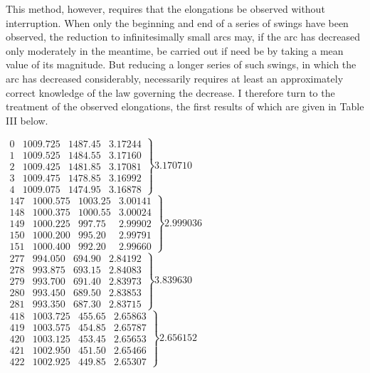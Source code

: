 This method, however, requires that the elongations be observed without interruption. When only the beginning and end of a series of swings have been observed, the reduction to infinitesimally small arcs may, if the arc has decreased only moderately in the meantime, be carried out if need be by taking a mean value of its magnitude. But reducing a longer series of such swings, in which the arc has decreased considerably, necessarily requires at least an approximately correct
knowledge of the law governing the decrease. I therefore turn to the treatment of the observed elongations, the first results of which are given in Table III below.
\begin{center}
\fontsize{9}{11}\selectfont
$\left.\begin{array}{r|r|r|r}
0&1009.725&1487.45&3.17244\\
1&1009.525&1484.55&3.17160\\
2&1009.425&1481.85&3.17081\\
3&1009.475&1478.85&3.16992\\
4&1009.075&1474.95&3.16878
\end{array}\right\}3.170710$\\[6pt]
$\left.\begin{array}{r|r|r|r}
147&1000.575&1003.25&3.00141\\
148&1000.375&1000.55&3.00024\\
149&1000.225&997.75&2.99902\\
150&1000.200&995.20&2.99791\\
151&1000.400&992.20&2.99660
\end{array}\right\}2.999036$\\[6pt]
$\left.\begin{array}{r|r|r|r}
277&994.050&694.90&2.84192\\
278&993.875&693.15&2.84083\\
279&993.700&691.40&2.83973\\
280&993.450&689.50&2.83853\\
281&993.350&687.30&2.83715
\end{array}\right\}3.839630$\\[6pt]
$\left.\begin{array}{r|r|r|r}
418&1003.725&455.65&2.65863\\
419&1003.575&454.85&2.65787\\
420&1003.125&453.45&2.65653\\
421&1002.950&451.50&2.65466\\
422&1002.925&449.85&2.65307
\end{array}\right\}2.656152$
\end{center}

